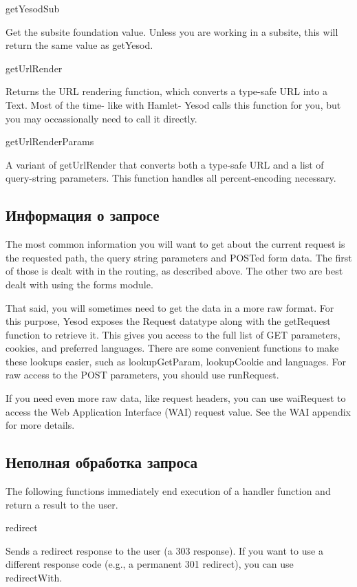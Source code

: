 getYesodSub

Get the subsite foundation value. Unless you are working in a subsite,
this will return the same value as getYesod.

getUrlRender

Returns the URL rendering function, which converts a type-safe URL
into a Text. Most of the time- like with Hamlet- Yesod calls this
function for you, but you may occassionally need to call it directly.

getUrlRenderParams

A variant of getUrlRender that converts both a type-safe URL and a
list of query-string parameters. This function handles all
percent-encoding necessary.

\subsection{Информация о запросе}

The most common information you will want to get about the current
request is the requested path, the query string parameters and POSTed
form data. The first of those is dealt with in the routing, as
described above. The other two are best dealt with using the forms
module.

That said, you will sometimes need to get the data in a more raw
format. For this purpose, Yesod exposes the Request datatype along
with the getRequest function to retrieve it. This gives you access to
the full list of GET parameters, cookies, and preferred
languages. There are some convenient functions to make these lookups
easier, such as lookupGetParam, lookupCookie and languages. For raw
access to the POST parameters, you should use runRequest.

If you need even more raw data, like request headers, you can use
waiRequest to access the Web Application Interface (WAI) request
value. See the WAI appendix for more details.

\subsection{Неполная обработка запроса}

The following functions immediately end execution of a handler
function and return a result to the user.

redirect

Sends a redirect response to the user (a 303 response). If you want to
use a different response code (e.g., a permanent 301 redirect), you
can use redirectWith.

